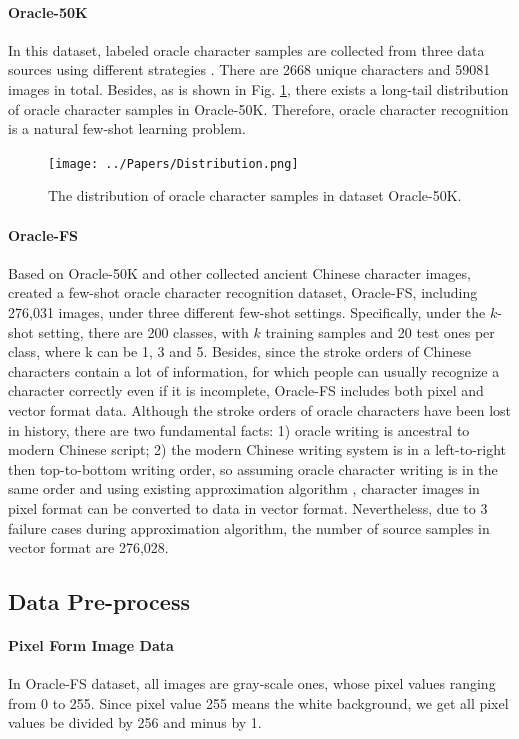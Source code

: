 \documentclass{article}
\begin{document}
\paragraph{Oracle-50K}
In this dataset, labeled oracle character samples are collected  from three data sources using different strategies \citep{Orc-BERT}. There are 2668 unique characters and 59081 images in total. Besides, as is shown in Fig. \ref{fig:distribution}, there exists a long-tail distribution of oracle character samples in Oracle-50K. Therefore, oracle character recognition is a natural few-shot learning problem.

\begin{figure}[p]
	\centering
	\texttt{[image: ../Papers/Distribution.png]}
	\caption{The distribution of oracle character samples in dataset Oracle-50K.}
	\label{fig:distribution}
\end{figure}

\paragraph{Oracle-FS}
Based on Oracle-50K and other collected ancient Chinese character images, \cite{Orc-BERT} created a few-shot oracle character recognition dataset, Oracle-FS, including 276,031 images, under three different few-shot settings. 
Specifically, under the $k$-shot setting, there are 200 classes, with $k$ training samples and 20 test ones per class, where k can be 1, 3 and 5.
Besides, since the stroke orders of Chinese characters contain a lot of information, for which people can usually recognize a character correctly even if it is incomplete, Oracle-FS includes both pixel and vector format data.
Although the stroke orders of oracle characters have been lost in history, there are two fundamental facts: 1) oracle writing is ancestral to modern Chinese script; 2) the modern Chinese writing system is in a left-to-right then top-to-bottom writing order, so assuming oracle character writing is in the same order and using existing approximation algorithm \citep{Handwriting}, character images in pixel format can be converted to data in vector format.  
Nevertheless, due to 3 failure cases during approximation algorithm, the number of source samples in vector format are 276,028.

\subsection{Data Pre-process}

\paragraph{Pixel Form Image Data}
In Oracle-FS dataset, all images are gray-scale ones, whose pixel values ranging from 0 to 255. Since pixel value 255 means the white background, we get all pixel values be divided by 256 and minus by 1.
\end{document}
